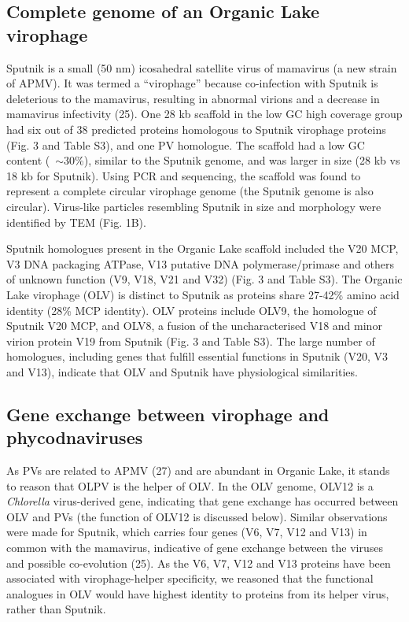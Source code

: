\subsection{Complete genome of an Organic Lake virophage}
Sputnik is a small (50 nm) icosahedral satellite virus of mamavirus (a new strain of APMV). 
It was termed a ``virophage'' because co-infection with Sputnik is deleterious to the mamavirus, resulting in abnormal virions and a decrease in mamavirus infectivity (25). 
One 28 kb scaffold in the low GC high coverage group had six out of 38 predicted proteins homologous to Sputnik virophage proteins (Fig. 3 and Table S3), and one PV homologue. 
The scaffold had a low GC content (~$\sim$30\%), similar to the Sputnik genome, and was larger in size (28 kb vs 18 kb for Sputnik). 
Using PCR and sequencing, the scaffold was found to represent a complete circular virophage genome (the Sputnik genome is also circular). Virus-like particles resembling Sputnik in size and morphology were identified by TEM (Fig. 1B).

Sputnik homologues present in the Organic Lake scaffold included the V20 MCP, V3 DNA packaging ATPase, V13 putative DNA polymerase/primase and others of unknown function (V9, V18, V21 and V32) (Fig. 3 and Table S3). 
The Organic Lake virophage (OLV) is distinct to Sputnik as proteins share 27-42\% amino acid identity (28\% MCP identity). 
OLV proteins include OLV9, the homologue of Sputnik V20 MCP, and OLV8, a fusion of the uncharacterised V18 and minor virion protein V19 from Sputnik (Fig. 3 and Table S3). 
The large number of homologues, including genes that fulfill essential functions in Sputnik (V20, V3 and V13), indicate that OLV and Sputnik have physiological similarities. 

\subsection{Gene exchange between virophage and phycodnaviruses}

As PVs are related to APMV (27) and are abundant in Organic Lake, it stands to reason that OLPV is the helper of OLV. 
In the OLV genome, OLV12 is a \emph{Chlorella} virus-derived gene, indicating that gene exchange has occurred between OLV and PVs (the function of OLV12 is discussed below). 
Similar observations were made for Sputnik, which carries four genes (V6, V7, V12 and V13) in common with the mamavirus, indicative of gene exchange between the viruses and possible co-evolution (25). 
As the V6, V7, V12 and V13 proteins have been associated with virophage-helper specificity, we reasoned that the functional analogues in OLV would have highest identity to proteins from its helper virus, rather than Sputnik. 

